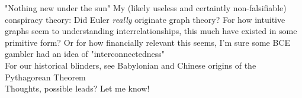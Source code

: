 \documentclass{beamer}
\begin{document}
\begin{frame}{"Nothing new under the sun"}
    My (likely useless and certaintly non-falsifiable) conspiracy theory: Did Euler {\it really} originate graph theory? For how intuitive graphs seem to understanding interrelationships, this much have existed in some primitive form? Or for how financially relevant this seems, I'm sure some BCE gambler had an idea of "interconnectedness"\newline \\ 
    For our historical blinders, see Babylonian and Chinese origins of the Pythagorean Theorem \newline \\ 
    Thoughts, possible leads? Let me know!
\end{frame}
\end{document}
